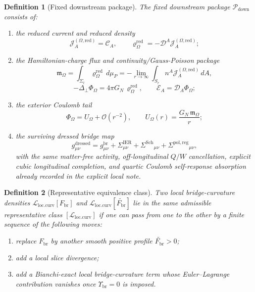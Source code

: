 \documentclass[11pt]{article}
\newcommand{\SpatialD}{\mathcal D}
\newcommand{\LapPerp}{\Delta_\perp}
\newcommand{\FlowPot}{\Phi_\Omega}
\newcommand{\CoulPot}{U_\Omega}
\newcommand{\SourceDensityRed}{\varrho_\Omega^{\mathrm{red}}}
\newcommand{\SourceCurrentRed}{\mathcal J^{(\Omega,\mathrm{red})}}
\newcommand{\ConstCurrent}{\mathcal C}
\newcommand{\SourceFlux}{\mathcal E}
\newcommand{\HamChargeOmega}{\mathfrak m_\Omega}
\newcommand{\SigmaIER}{\Sigma^{\mathrm{IER}}}
\newcommand{\SigmaDressSch}{\Sigma^{\mathrm{Sch}}}
\newcommand{\SigmaRegPol}{\Sigma^{\mathrm{pol,reg}}}
\newcommand{\CurvSeedMult}{\Upsilon_{\mathrm{br}}}
\newcommand{\CurvProfile}{F_{\mathrm{br}}}
\newcommand{\CurvQuot}{[\mathcal L_{\mathrm{loc.curv}}]}
\newcommand{\DownPkg}{\mathscr P_{\mathrm{down}}}
\newtheorem{definition}{Definition}
\begin{document}
\begin{definition}[Fixed downstream package]
\label{def:downstream}
The \emph{fixed downstream package} \(\DownPkg\) consists of:
\begin{enumerate}
    \item the reduced current and reduced density
    \begin{equation}
    \SourceCurrentRed_A=\ConstCurrent_A,
    \qquad
    \SourceDensityRed=-\SpatialD^A\SourceCurrentRed_A;
    \label{eq:pkgcurrent}
    \end{equation}
    \item the Hamiltonian-charge flux and continuity/Gauss-Poisson package
    \begin{equation}
    \HamChargeOmega
    =
    \int_{\Sigma_t}\SourceDensityRed\,d\mu_P
    =
    -\lim_{r\to\infty}\int_{S_r} n^A\SourceCurrentRed_A\,dA,
    \label{eq:pkgcharge}
    \end{equation}
    \begin{equation}
    -\LapPerp\FlowPot=4\pi G_N\,\SourceDensityRed,
    \qquad
    \SourceFlux_A=\SpatialD_A\FlowPot;
    \label{eq:pkgpoisson}
    \end{equation}
    \item the exterior Coulomb tail
    \begin{equation}
    \FlowPot
    =
    \CoulPot+\mathcal O(r^{-2}),
    \qquad
    \CoulPot(r)=\frac{G_N\,\HamChargeOmega}{r};
    \label{eq:pkgcoul}
    \end{equation}
    \item the surviving dressed bridge map
    \begin{equation}
    g_{\mu\nu}^{\mathrm{dressed}}
    =
    g_{\mu\nu}^{\mathrm{br}}
    +\SigmaIER_{\mu\nu}
    +\SigmaDressSch{}_{\mu\nu}
    +\SigmaRegPol{}_{\mu\nu},
    \label{eq:pkgmetric}
    \end{equation}
    with the same matter-free activity, off-longitudinal \(Q/W\) cancellation, explicit cubic longitudinal completion, and quartic Coulomb self-response absorption already recorded in the explicit local note.
\end{enumerate}
\end{definition}

\begin{definition}[Representative equivalence class]
\label{def:equivalence}
Two local bridge-curvature densities \(\mathcal L_{\mathrm{loc.curv}}[\CurvProfile]\) and \(\mathcal L_{\mathrm{loc.curv}}[\widetilde{\CurvProfile}]\) lie in the same admissible representative class \(\CurvQuot\) if one can pass from one to the other by a finite sequence of the following moves:
\begin{enumerate}
    \item replace \(\CurvProfile\) by another smooth positive profile \(\widetilde{\CurvProfile}>0\);
    \item add a local slice divergence;
    \item add a Bianchi-exact local bridge-curvature term whose Euler--Lagrange contribution vanishes once \(\CurvSeedMult=0\) is imposed.
\end{enumerate}
\end{definition}
\end{document}
